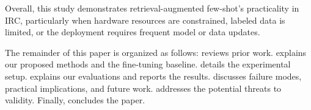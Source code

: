 Overall, this study demonstrates retrieval-augmented few-shot's practicality in IRC, particularly when hardware resources are constrained, labeled data is limited, or the deployment requires frequent model or data updates. 

The remainder of this paper is organized as follows:  reviews prior work.  explains our proposed methods and the fine-tuning baseline.  details the experimental setup.  explains our
evaluations and reports the results.  discusses failure modes, practical implications, and future work.  addresses the potential threats to validity. Finally,  concludes the paper.



